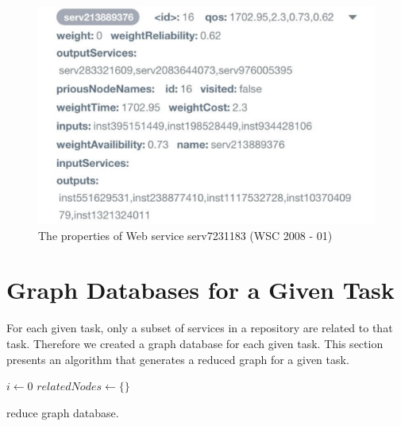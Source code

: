\begin{figure}[h]
\includegraphics[scale = 0.6]{The-properties-of-Web-service-serv213889376.pdf}
\centering
\caption{The properties of Web service serv7231183 (WSC 2008 - 01)}
\label{fig:servProp} 
\end{figure} 

\section{Graph Databases for a Given Task}
For each given task, only a subset of services in a repository are related to that task. Therefore we created a graph database for each given task. This section presents an algorithm that generates a reduced graph for a given task. \\

\begin{algorithm}[h]
 \LinesNumbered
 \SetNlSty{}{}{:}
 $i \leftarrow 0$\;
 $relatedNodes \leftarrow \{\}$\;
 \caption{\footnotesize reduce graph database.}
\label{generation}
\end{algorithm}
\setlength{\textfloatsep}{20pt}%


